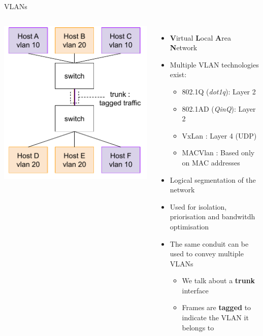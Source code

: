 \begin{frame}{VLANs}
	\begin{columns}
			\includegraphics[width=1.1\textwidth]{slides/networking-stack-overview/vlan_topo.pdf}
	\begin{itemize}
		\item \textbf{V}irtual \textbf{L}ocal \textbf{A}rea \textbf{N}etwork
		\item Multiple VLAN technologies exist:
			\begin{itemize}
				\item 802.1Q (\textit{dot1q}): Layer 2
				\item 802.1AD (\textit{QinQ}): Layer 2
				\item VxLan : Layer 4 (UDP)
				\item MACVlan : Based only on MAC addresses
			\end{itemize}
		\item Logical segmentation of the network
		\item Used for isolation, priorisation and bandwitdh optimisation
		\item The same conduit can be used to convey multiple VLANs
			\begin{itemize}
				\item We talk about a \textbf{trunk} interface
				\item Frames are \textbf{tagged} to indicate the VLAN it belongs to
			\end{itemize}
	\end{itemize}
	\end{columns}
\end{frame}

